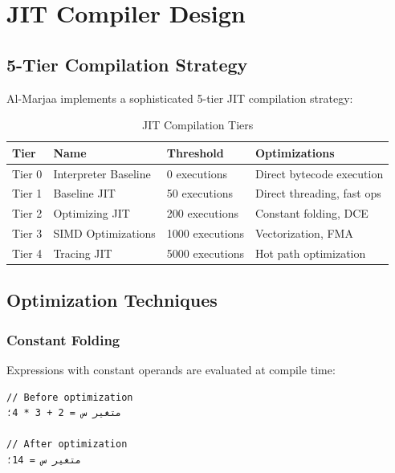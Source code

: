 \documentclass[11pt,a4paper]{article}
\begin{document}
\section{JIT Compiler Design}
\label{sec:jit}

\subsection{5-Tier Compilation Strategy}

Al-Marjaa implements a sophisticated 5-tier JIT compilation strategy:

\begin{table}[h]
\centering
\caption{JIT Compilation Tiers}
\label{tab:jit-tiers}
\begin{tabular}{@{}llll@{}}
\toprule
\textbf{Tier} & \textbf{Name} & \textbf{Threshold} & \textbf{Optimizations} \\
\midrule
Tier 0 & Interpreter Baseline & 0 executions & Direct bytecode execution \\
Tier 1 & Baseline JIT & 50 executions & Direct threading, fast ops \\
Tier 2 & Optimizing JIT & 200 executions & Constant folding, DCE \\
Tier 3 & SIMD Optimizations & 1000 executions & Vectorization, FMA \\
Tier 4 & Tracing JIT & 5000 executions & Hot path optimization \\
\bottomrule
\end{tabular}
\end{table}

\subsection{Optimization Techniques}

\subsubsection{Constant Folding}

Expressions with constant operands are evaluated at compile time:

\begin{lstlisting}[language={},title={Constant Folding}]
// Before optimization
متغير س = 2 + 3 * 4؛

// After optimization
متغير س = 14؛
\end{lstlisting}
\end{document}
